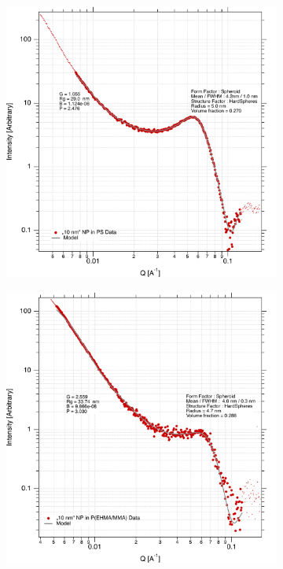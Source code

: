 \begin{figure}
	\begin{subfigure}[b]{0.42\textwidth}
		\includegraphics[width=\linewidth]{images/ps10.pdf}
	\end{subfigure}
	\begin{subfigure}[b]{0.42\textwidth}
		\includegraphics[width=\linewidth]{images/pmma10.pdf}
	\end{subfigure}


\end{figure}
